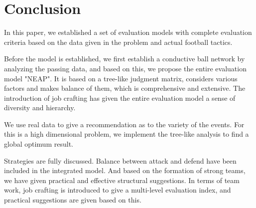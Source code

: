 \documentclass{mcmthesis}
\begin{document}
\section{Conclusion}
	In this paper, we established a set of evaluation models with complete evaluation criteria based on the data given in the problem and actual football tactics.

	Before the model is established, we first establish a conductive ball network by analyzing the passing data, and based on this, we propose the entire evaluation model "NEAP". It is based on a tree-like judgment matrix, considers various factors and makes balance of them, which is comprehensive and extensive.  The introduction of job crafting has given the entire evaluation model a sense of diversity and hierarchy.

	We use real data to give a recommendation as to the variety of the events. For this is a high dimensional problem, we implement the tree-like analysis to find a global optimum result.

	Strategies are fully discussed. Balance between attack and defend have been included in the integrated model. And based on the formation of strong teams, we have given practical and effective structural suggestions.  In terms of team work, job crafting is introduced to give a multi-level evaluation index, and practical suggestions are given based on this.

\newpage
\end{document}
